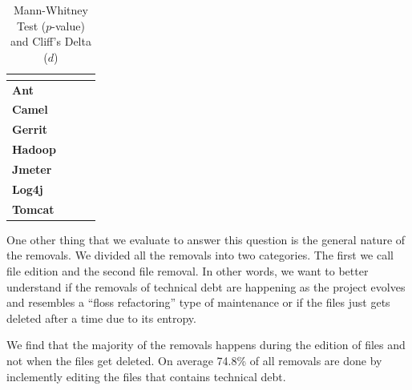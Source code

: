 \begin{table}[!thb]
	\begin{center}
		\caption{Mann-Whitney Test ($p$-value) and Cliff's Delta ($d$)}
		\label{tbl:statistic}
		\begin{tabular}{l| rrr}
			\toprule
			\textbf{\thead{Project}} & \textbf{\thead{$p$-value}} & \textbf{\thead{$d$}}\\ 
			\midrule
			\textbf{Ant   }   &    &    \\  
			\textbf{Camel }   &    &    \\  
			\textbf{Gerrit}   &    &    \\  
			\textbf{Hadoop}   &    &    \\  
			\textbf{Jmeter}   &    &    \\  
			\textbf{Log4j }   &    &    \\  
			\textbf{Tomcat}   &    &    \\  
			\bottomrule
		\end{tabular}
	\end{center}    
\end{table}






One other thing that we evaluate to answer this question is the general nature of the removals. We divided all the removals into two categories. The first we call file edition and the second file removal. In other words, we want to better understand if the removals of technical debt are happening as the project evolves and resembles a ``floss refactoring'' type of maintenance or if the files just gets deleted after a time due to its entropy. 

We find that the majority of the removals happens during the edition of files and not when the files get deleted. On average 74.8\% of all removals are done by inclemently editing the files that contains technical debt.





